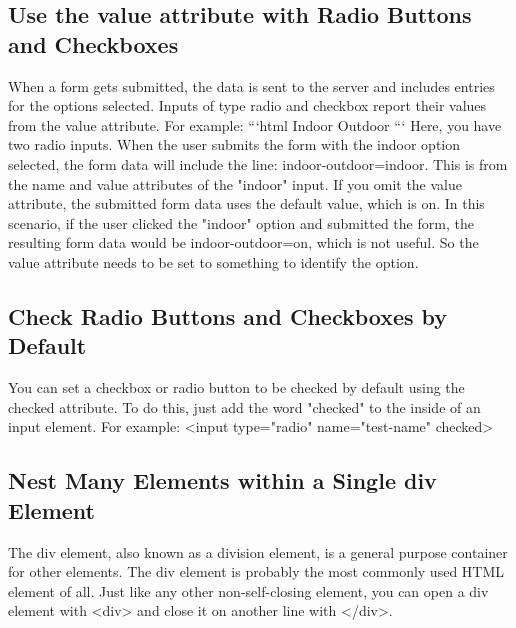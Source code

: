 \documentclass{article}%
\begin{document}
%
\subsection{Use the value attribute with Radio Buttons and Checkboxes}%
\label{subsec:UsethevalueattributewithRadioButtonsandCheckboxes}%
When a form gets submitted, the data is sent to the server and includes entries for the options selected. Inputs of type radio and checkbox report their values from the value attribute.\newline%
For example:\newline%
```html\newline%
Indoor\newline%
Outdoor\newline%
```\newline%
Here, you have two radio inputs. When the user submits the form with the indoor option selected, the form data will include the line: indoor{-}outdoor=indoor. This is from the name and value attributes of the "indoor" input.\newline%
If you omit the value attribute, the submitted form data uses the default value, which is on. In this scenario, if the user clicked the "indoor" option and submitted the form, the resulting form data would be indoor{-}outdoor=on, which is not useful. So the value attribute needs to be set to something to identify the option.\newline%

%
\subsection{Check Radio Buttons and Checkboxes by Default}%
\label{subsec:CheckRadioButtonsandCheckboxesbyDefault}%
You can set a checkbox or radio button to be checked by default using the checked attribute.\newline%
To do this, just add the word "checked" to the inside of an input element. For example:\newline%
<input type="radio" name="test{-}name" checked>\newline%

%
\subsection{Nest Many Elements within a Single div Element}%
\label{subsec:NestManyElementswithinaSingledivElement}%
The div element, also known as a division element, is a general purpose container for other elements.\newline%
The div element is probably the most commonly used HTML element of all.\newline%
Just like any other non{-}self{-}closing element, you can open a div element with <div> and close it on another line with </div>.\newline%
\end{document}
